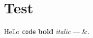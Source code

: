 \documentclass[11pt,a4paper]{article}
\begin{document}
\section{Test} Hello \texttt{code} {\bfseries bold} \textit{italic} --- \&.
\end{document}
